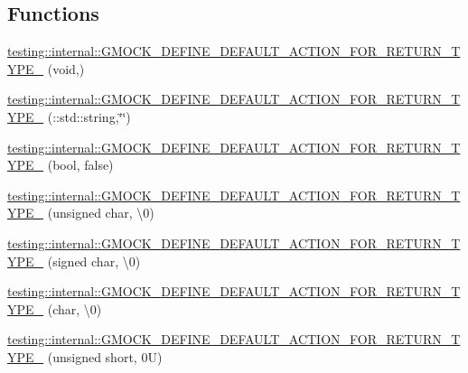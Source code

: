 \subsection*{Functions}
\begin{DoxyCompactItemize}
\item 
\hyperlink{namespacetesting_1_1internal_a8fe6f7c11d6d3dd6e42b75c9a5b43861}{testing\+::internal\+::\+G\+M\+O\+C\+K\+\_\+\+D\+E\+F\+I\+N\+E\+\_\+\+D\+E\+F\+A\+U\+L\+T\+\_\+\+A\+C\+T\+I\+O\+N\+\_\+\+F\+O\+R\+\_\+\+R\+E\+T\+U\+R\+N\+\_\+\+T\+Y\+P\+E\+\_\+} (void,)
\item 
\hyperlink{namespacetesting_1_1internal_a8b2b1008acaca5ba1f46998a3ae6a3ec}{testing\+::internal\+::\+G\+M\+O\+C\+K\+\_\+\+D\+E\+F\+I\+N\+E\+\_\+\+D\+E\+F\+A\+U\+L\+T\+\_\+\+A\+C\+T\+I\+O\+N\+\_\+\+F\+O\+R\+\_\+\+R\+E\+T\+U\+R\+N\+\_\+\+T\+Y\+P\+E\+\_\+} (\+::std\+::string,\char`\"{}\char`\"{})
\item 
\hyperlink{namespacetesting_1_1internal_aa6670915f42119e4ba20d8cb74fc1eea}{testing\+::internal\+::\+G\+M\+O\+C\+K\+\_\+\+D\+E\+F\+I\+N\+E\+\_\+\+D\+E\+F\+A\+U\+L\+T\+\_\+\+A\+C\+T\+I\+O\+N\+\_\+\+F\+O\+R\+\_\+\+R\+E\+T\+U\+R\+N\+\_\+\+T\+Y\+P\+E\+\_\+} (bool, false)
\item 
\hyperlink{namespacetesting_1_1internal_ab203e2c4c54f2ca86439344347a3e43f}{testing\+::internal\+::\+G\+M\+O\+C\+K\+\_\+\+D\+E\+F\+I\+N\+E\+\_\+\+D\+E\+F\+A\+U\+L\+T\+\_\+\+A\+C\+T\+I\+O\+N\+\_\+\+F\+O\+R\+\_\+\+R\+E\+T\+U\+R\+N\+\_\+\+T\+Y\+P\+E\+\_\+} (unsigned char, \textquotesingle{}\textbackslash{}0\textquotesingle{})
\item 
\hyperlink{namespacetesting_1_1internal_aaedb3b1b5307625bc84dc660742da3c6}{testing\+::internal\+::\+G\+M\+O\+C\+K\+\_\+\+D\+E\+F\+I\+N\+E\+\_\+\+D\+E\+F\+A\+U\+L\+T\+\_\+\+A\+C\+T\+I\+O\+N\+\_\+\+F\+O\+R\+\_\+\+R\+E\+T\+U\+R\+N\+\_\+\+T\+Y\+P\+E\+\_\+} (signed char, \textquotesingle{}\textbackslash{}0\textquotesingle{})
\item 
\hyperlink{namespacetesting_1_1internal_aeaaa7101572f283fe70a85ad5e6c65dc}{testing\+::internal\+::\+G\+M\+O\+C\+K\+\_\+\+D\+E\+F\+I\+N\+E\+\_\+\+D\+E\+F\+A\+U\+L\+T\+\_\+\+A\+C\+T\+I\+O\+N\+\_\+\+F\+O\+R\+\_\+\+R\+E\+T\+U\+R\+N\+\_\+\+T\+Y\+P\+E\+\_\+} (char, \textquotesingle{}\textbackslash{}0\textquotesingle{})
\item 
\hyperlink{namespacetesting_1_1internal_ab2965a6078670393812e67f8e5fcb072}{testing\+::internal\+::\+G\+M\+O\+C\+K\+\_\+\+D\+E\+F\+I\+N\+E\+\_\+\+D\+E\+F\+A\+U\+L\+T\+\_\+\+A\+C\+T\+I\+O\+N\+\_\+\+F\+O\+R\+\_\+\+R\+E\+T\+U\+R\+N\+\_\+\+T\+Y\+P\+E\+\_\+} (unsigned short, 0\+U)

\end{DoxyCompactItemize}
